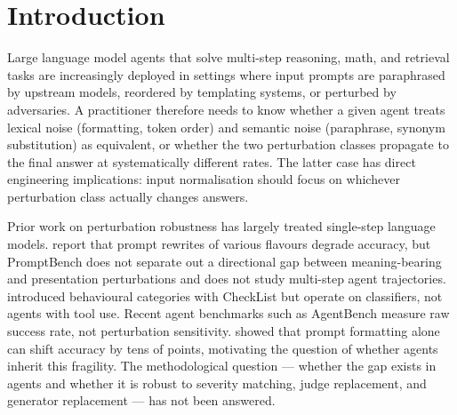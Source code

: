 \documentclass[11pt]{article}
\begin{document}
\section{Introduction}

Large language model agents that solve multi-step reasoning, math, and retrieval tasks are increasingly deployed in settings where input prompts are paraphrased by upstream models, reordered by templating systems, or perturbed by adversaries. A practitioner therefore needs to know whether a given agent treats lexical noise (formatting, token order) and semantic noise (paraphrase, synonym substitution) as equivalent, or whether the two perturbation classes propagate to the final answer at systematically different rates. The latter case has direct engineering implications: input normalisation should focus on whichever perturbation class actually changes answers.

Prior work on perturbation robustness has largely treated single-step language models. \citet{zhu2024promptbench} report that prompt rewrites of various flavours degrade accuracy, but PromptBench does not separate out a directional gap between meaning-bearing and presentation perturbations and does not study multi-step agent trajectories. \citet{ribeiro2020beyond} introduced behavioural categories with CheckList but operate on classifiers, not agents with tool use. Recent agent benchmarks such as AgentBench \citep{liu2024agentbench} measure raw success rate, not perturbation sensitivity. \citet{sclar2024quantifying} showed that prompt formatting alone can shift accuracy by tens of points, motivating the question of whether agents inherit this fragility. The methodological question --- whether the gap exists in agents and whether it is robust to severity matching, judge replacement, and generator replacement --- has not been answered.
\end{document}
